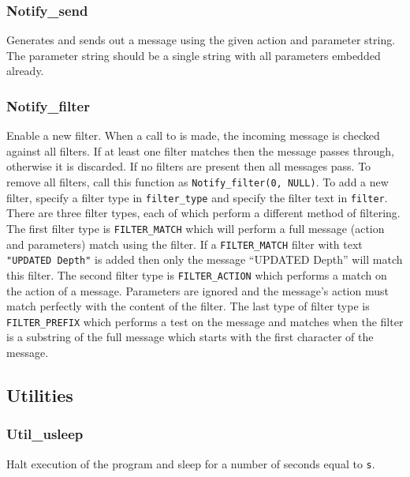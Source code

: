 \subsubsection{Notify\_send} \label{apinotifysend}
 Generates and sends
out a message using the given action and parameter string. The
parameter string should be a single string with all parameters
embedded already.

\subsubsection{Notify\_filter} \label{apinotifyfilter}
 Enable a new
filter. When a call to  is made,
the incoming message is checked against all filters. If at least one filter
matches then the message passes through, otherwise it is discarded. If no
filters are present then all messages pass. To remove all filters, call this
function as \lstinline[language=Cextended]!Notify_filter(0, NULL)!.  To add a
new filter, specify a filter type in \texttt{filter\_type} and specify the
filter text in \texttt{filter}. There are three filter types, each of which
perform a different method of filtering. The first filter type is
\texttt{FILTER\_MATCH} which will perform a full message (action and parameters)
match using the filter. If a \texttt{FILTER\_MATCH} filter with text
\lstinline[language=Cextended]!"UPDATED Depth"! is added then only the message
``UPDATED Depth'' will match this filter. The second filter type is
\texttt{FILTER\_ACTION} which performs a match on the action of a
message. Parameters are ignored and the message's action must match perfectly
with the content of the filter. The last type of filter type is
\texttt{FILTER\_PREFIX} which performs a test on the message and matches when
the filter is a substring of the full message which starts with the first
character of the message.

\subsection{Utilities} \label{apiutilities}
\subsubsection{Util\_usleep} \label{apiutilsleep}
 Halt execution of the program and sleep for a
number of seconds equal to \texttt{s}. 

